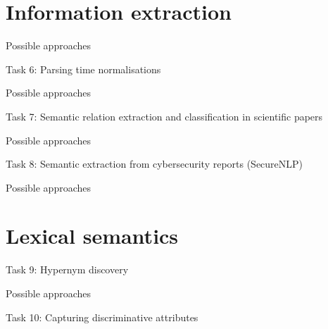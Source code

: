 \documentclass[10pt, compress]{beamer}
\begin{document}
\section{Information extraction}

\begin{frame}{Possible approaches}


\end{frame}

\begin{frame}{Task 6: Parsing time normalisations}


\end{frame}

\begin{frame}{Possible approaches}


\end{frame}

\begin{frame}{Task 7: Semantic relation extraction and classification in scientific papers}


\end{frame}

\begin{frame}{Possible approaches}


\end{frame}

\begin{frame}{Task 8: Semantic extraction from cybersecurity reports (SecureNLP)}


\end{frame}

\begin{frame}{Possible approaches}


\end{frame}

\section{Lexical semantics}

\begin{frame}{Task 9: Hypernym discovery}


\end{frame}

\begin{frame}{Possible approaches}


\end{frame}

\begin{frame}{Task 10: Capturing discriminative attributes}


\end{frame}
\end{document}
